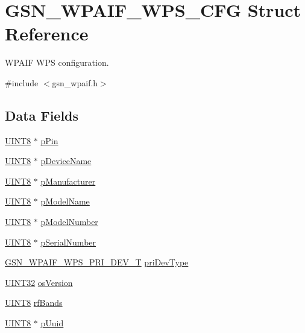 \hypertarget{a00427}{
\section{GSN\_\-WPAIF\_\-WPS\_\-CFG Struct Reference}
\label{a00427}
}


WPAIF WPS configuration.  




{\ttfamily \#include $<$gsn\_\-wpaif.h$>$}

\subsection*{Data Fields}
\begin{DoxyCompactItemize}
\item 
\hyperlink{a00660_gab27e9918b538ce9d8ca692479b375b6a}{UINT8} $\ast$ \hyperlink{a00427_a09fc73c85af39fd4a7fe59a7be642f62}{pPin}
\item 
\hyperlink{a00660_gab27e9918b538ce9d8ca692479b375b6a}{UINT8} $\ast$ \hyperlink{a00427_a0690be2839815861009b4509a038fe1a}{pDeviceName}
\item 
\hyperlink{a00660_gab27e9918b538ce9d8ca692479b375b6a}{UINT8} $\ast$ \hyperlink{a00427_ac4d49e4679a63d847dcfbf72a54c43cf}{pManufacturer}
\item 
\hyperlink{a00660_gab27e9918b538ce9d8ca692479b375b6a}{UINT8} $\ast$ \hyperlink{a00427_a5466054ddbc5ae79c989aa024d95d5b1}{pModelName}
\item 
\hyperlink{a00660_gab27e9918b538ce9d8ca692479b375b6a}{UINT8} $\ast$ \hyperlink{a00427_a8cf499260c5308598ec0ebf2833648eb}{pModelNumber}
\item 
\hyperlink{a00660_gab27e9918b538ce9d8ca692479b375b6a}{UINT8} $\ast$ \hyperlink{a00427_a22ea7e7af119a5bf1946646753205fd5}{pSerialNumber}
\item 
\hyperlink{a00428}{GSN\_\-WPAIF\_\-WPS\_\-PRI\_\-DEV\_\-T} \hyperlink{a00427_ae427de8cc9031fdd869fb8eef7930bab}{priDevType}
\item 
\hyperlink{a00660_gae1e6edbbc26d6fbc71a90190d0266018}{UINT32} \hyperlink{a00427_aaf83aed06b536137725f61a663df99d0}{osVersion}
\item 
\hyperlink{a00660_gab27e9918b538ce9d8ca692479b375b6a}{UINT8} \hyperlink{a00427_acff317d8487a8aeadf1b0c29f6ac5099}{rfBands}
\item 
\hyperlink{a00660_gab27e9918b538ce9d8ca692479b375b6a}{UINT8} $\ast$ \hyperlink{a00427_ac9629a29e7c03e9f6c8b93e2e31c4ca7}{pUuid}
\item 

\end{DoxyCompactItemize}
